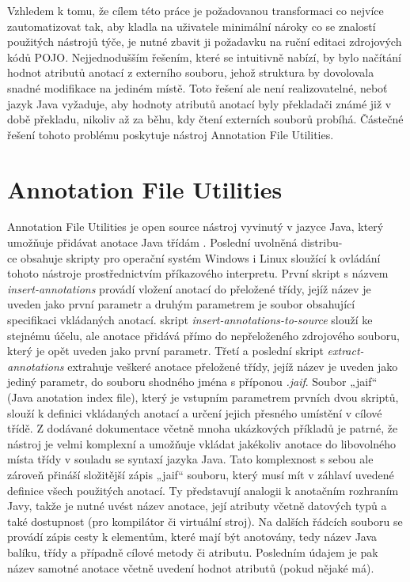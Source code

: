 \documentclass{projekt}
\begin{document}
Vzhledem k tomu, že cílem této práce je požadovanou transformaci co nejvíce zautomatizovat tak, aby kladla na uživatele minimální nároky co se znalostí použitých nástrojů týče, je nutné zbavit ji požadavku na ruční editaci zdrojových kódů POJO.
Nejjednodušším řešením, které se intuitivně nabízí, by bylo načítání hodnot atributů anotací z externího souboru, jehož struktura by dovolovala snadné modifikace na jediném místě. Toto řešení ale není realizovatelné, neboť jazyk Java vyžaduje, aby hodnoty atributů anotací byly překladači známé již v době překladu, nikoliv až za běhu, kdy čtení externích souborů probíhá. Částečné řešení tohoto problému poskytuje nástroj Annotation File Utilities.

\section{Annotation File Utilities}

\hspace{0.65cm}Annotation File Utilities je open source nástroj vyvinutý v jazyce Java, který umožňuje přidávat anotace Java třídám \cite{osmnact}. Poslední uvolněná distribu-\\ce obsahuje skripty pro operační systém Windows i Linux sloužící k ovládání tohoto nástroje prostřednictvím příkazového interpretu. První skript s názvem {\it insert-annotations} provádí vložení anotací do přeložené třídy, jejíž název je uveden jako první parametr a druhým parametrem je soubor obsahující specifikaci vkládaných anotací. skript {\it insert-annotations-to-source} slouží ke stejnému účelu, ale anotace přidává přímo do nepřeloženého zdrojového souboru, který je opět uveden jako první parametr. Třetí a poslední skript {\it extract-annotations} extrahuje veškeré anotace přeložené třídy, jejíž název je uveden jako jediný parametr, do souboru shodného jména s příponou {\it .jaif}.
Soubor „jaif“ (Java anotation index file), který je vstupním parametrem prvních dvou skriptů, slouží k definici vkládaných anotací a určení jejich přesného umístění v cílové třídě. Z dodávané dokumentace včetně mnoha ukázkových příkladů je patrné, že nástroj je velmi komplexní a umožňuje vkládat jakékoliv anotace do libovolného místa třídy v souladu se syntaxí jazyka Java. Tato komplexnost s sebou ale zároveň přináší složitější zápis „jaif“ souboru, který musí mít v záhlaví uvedené definice všech použitých anotací. Ty představují analogii k anotačním rozhraním Javy, takže je nutné uvést název anotace, její atributy včetně datových typů a také dostupnost (pro kompilátor či virtuální stroj). 
Na dalších řádcích souboru se provádí zápis cesty k elementům, které mají být anotovány, tedy název Java balíku, třídy a případně cílové metody či atributu. Posledním údajem je pak název samotné anotace včetně uvedení hodnot atributů (pokud nějaké má).
\end{document}
